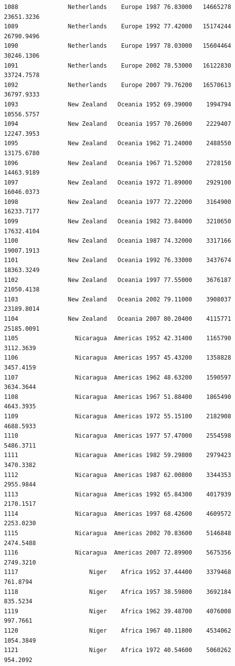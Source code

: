 \documentclass[
  letterpaper,
  DIV=11,
  numbers=noendperiod]{scrreprt}
\begin{document}
\begin{verbatim}
1088              Netherlands    Europe 1987 76.83000   14665278  23651.3236
1089              Netherlands    Europe 1992 77.42000   15174244  26790.9496
1090              Netherlands    Europe 1997 78.03000   15604464  30246.1306
1091              Netherlands    Europe 2002 78.53000   16122830  33724.7578
1092              Netherlands    Europe 2007 79.76200   16570613  36797.9333
1093              New Zealand   Oceania 1952 69.39000    1994794  10556.5757
1094              New Zealand   Oceania 1957 70.26000    2229407  12247.3953
1095              New Zealand   Oceania 1962 71.24000    2488550  13175.6780
1096              New Zealand   Oceania 1967 71.52000    2728150  14463.9189
1097              New Zealand   Oceania 1972 71.89000    2929100  16046.0373
1098              New Zealand   Oceania 1977 72.22000    3164900  16233.7177
1099              New Zealand   Oceania 1982 73.84000    3210650  17632.4104
1100              New Zealand   Oceania 1987 74.32000    3317166  19007.1913
1101              New Zealand   Oceania 1992 76.33000    3437674  18363.3249
1102              New Zealand   Oceania 1997 77.55000    3676187  21050.4138
1103              New Zealand   Oceania 2002 79.11000    3908037  23189.8014
1104              New Zealand   Oceania 2007 80.20400    4115771  25185.0091
1105                Nicaragua  Americas 1952 42.31400    1165790   3112.3639
1106                Nicaragua  Americas 1957 45.43200    1358828   3457.4159
1107                Nicaragua  Americas 1962 48.63200    1590597   3634.3644
1108                Nicaragua  Americas 1967 51.88400    1865490   4643.3935
1109                Nicaragua  Americas 1972 55.15100    2182908   4688.5933
1110                Nicaragua  Americas 1977 57.47000    2554598   5486.3711
1111                Nicaragua  Americas 1982 59.29800    2979423   3470.3382
1112                Nicaragua  Americas 1987 62.00800    3344353   2955.9844
1113                Nicaragua  Americas 1992 65.84300    4017939   2170.1517
1114                Nicaragua  Americas 1997 68.42600    4609572   2253.0230
1115                Nicaragua  Americas 2002 70.83600    5146848   2474.5488
1116                Nicaragua  Americas 2007 72.89900    5675356   2749.3210
1117                    Niger    Africa 1952 37.44400    3379468    761.8794
1118                    Niger    Africa 1957 38.59800    3692184    835.5234
1119                    Niger    Africa 1962 39.48700    4076008    997.7661
1120                    Niger    Africa 1967 40.11800    4534062   1054.3849
1121                    Niger    Africa 1972 40.54600    5060262    954.2092

\end{verbatim}
\end{document}
